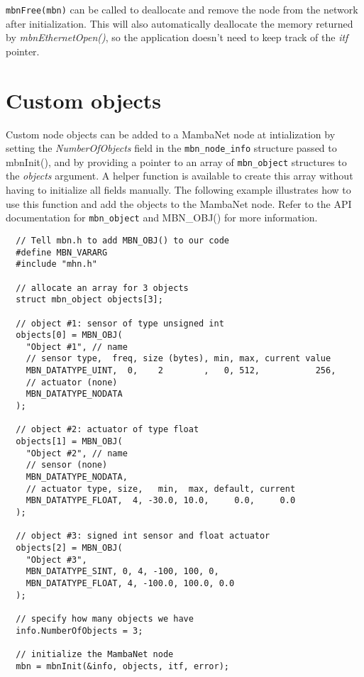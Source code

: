 \verb|mbnFree(mbn)| can be called to deallocate and remove the node from the network after initialization. This will also automatically deallocate the memory returned by \textit{mbnEthernetOpen()}, so the application doesn't need to keep track of the \textit{itf} pointer.




\section{Custom objects}
Custom node objects can be added to a MambaNet node at intialization by setting the \textit{NumberOfObjects} field in the \verb|mbn_node_info| structure passed to mbnInit(), and by providing a pointer to an array of \verb|mbn_object| structures to the \textit{objects} argument. A helper function is available to create this array without having to initialize all fields manually. The following example illustrates how to use this function and add the objects to the MambaNet node. Refer to the API documentation for \verb|mbn_object| and MBN\_OBJ() for more information.
\begin{verbatim}
  // Tell mbn.h to add MBN_OBJ() to our code
  #define MBN_VARARG
  #include "mhn.h"
  
  // allocate an array for 3 objects
  struct mbn_object objects[3];
  
  // object #1: sensor of type unsigned int
  objects[0] = MBN_OBJ(
    "Object #1", // name
    // sensor type,  freq, size (bytes), min, max, current value
    MBN_DATATYPE_UINT,  0,    2        ,   0, 512,           256,
    // actuator (none)
    MBN_DATATYPE_NODATA
  );
  
  // object #2: actuator of type float
  objects[1] = MBN_OBJ(
    "Object #2", // name
    // sensor (none)
    MBN_DATATYPE_NODATA,
    // actuator type, size,   min,  max, default, current
    MBN_DATATYPE_FLOAT,  4, -30.0, 10.0,     0.0,     0.0
  );
  
  // object #3: signed int sensor and float actuator
  objects[2] = MBN_OBJ(
    "Object #3",
    MBN_DATATYPE_SINT, 0, 4, -100, 100, 0,
    MBN_DATATYPE_FLOAT, 4, -100.0, 100.0, 0.0
  );
  
  // specify how many objects we have
  info.NumberOfObjects = 3;
  
  // initialize the MambaNet node
  mbn = mbnInit(&info, objects, itf, error);
\end{verbatim}

